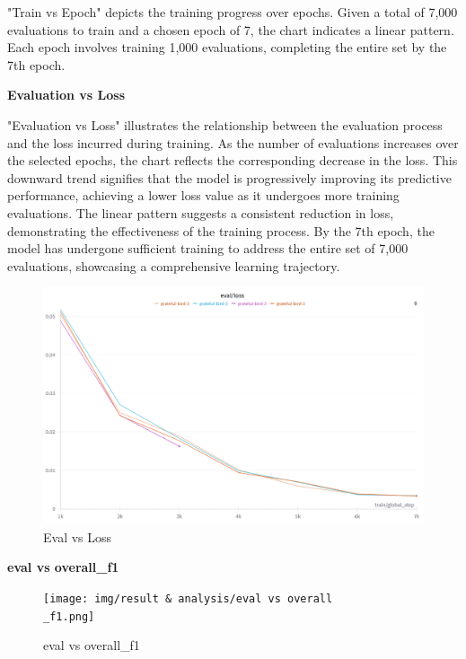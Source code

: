  
"Train vs Epoch" depicts the training progress over epochs. Given a total of 7,000 evaluations to train and a chosen epoch of 7, the chart indicates a linear pattern. Each epoch involves training 1,000 evaluations, completing the entire set by the 7th epoch.

\textbf{Evaluation vs Loss}

"Evaluation vs Loss" illustrates the relationship between the evaluation process and the loss incurred during training. As the number of evaluations increases over the selected epochs, the chart reflects the corresponding decrease in the loss. This downward trend signifies that the model is progressively improving its predictive performance, achieving a lower loss value as it undergoes more training evaluations. The linear pattern suggests a consistent reduction in loss, demonstrating the effectiveness of the training process. By the 7th epoch, the model has undergone sufficient training to address the entire set of 7,000 evaluations, showcasing a comprehensive learning trajectory.

\begin{figure}[H]
\centering
\includegraphics [scale=0.55]{img/result & analysis/Eval vs Loss.png}
 \caption[Eval vs Loss]{Eval vs Loss}

\end{figure}

 

\textbf{eval vs overall\_f1}

\begin{figure}[H]
\centering
\texttt{[image: img/result \& analysis/eval vs overall\\\_f1.png]}
 \caption[eval vs overall\_f1]{eval vs overall\_f1}

\end{figure}


